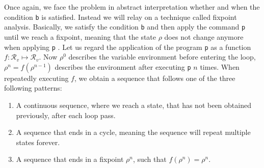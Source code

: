 \noindent Once again, we face the problem in abstract interpretation whether and when the condition \texttt{b} is satisfied. Instead we will relay on a technique called fixpoint analysis. Basically, we satisfy the condition \texttt{b} and then apply the command \texttt{p} until we reach a fixpoint, meaning that the state $\rho$ does not change anymore when applying \texttt{p} \cite{cousot1977}. Let us regard the application of the program \texttt{p} as a function $f: \mathcal{R}_v\mapsto \mathcal{R}_v$. Now $\rho^0$ describes the variable environment before entering the loop, $\rho^n=f(\rho^{n-1})$ describes the environment after executing \texttt{p} $n$ times. When repeatedly executing $f$, we obtain a sequence that follows one of the three following patterns:

\begin{enumerate}
	\item A continuous sequence, where we reach a state, that has not been obtained previously, after each loop pass.\\
\begin{center}
\end{center}

	\item \parbox[t]{\linewidth}{A sequence that ends in a cycle, meaning the sequence will repeat multiple states forever.\\
\begin{center}
\end{center}
}
	\item A sequence that ends in a fixpoint $\rho^n$, such that $f(\rho^n)=\rho^n$.\\
\begin{center}
\end{center}
\end{enumerate}
